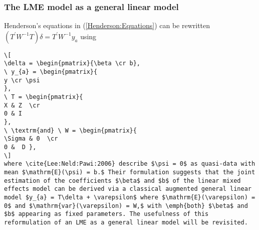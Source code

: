 \documentclass[MAIN.tex]{subfiles}
\begin{document}
\subsubsection{The LME model as a general linear model}
Henderson's equations in (\ref{Henderson:Equations}) can be rewritten $( T^\prime W^{-1} T ) \delta = T^\prime W^{-1} y_{a} $ using
\begin{verbatim}
\[
\delta = \begin{pmatrix}{\beta \cr b},
\ y_{a} = \begin{pmatrix}{
y \cr \psi
},
\ T = \begin{pmatrix}{
X & Z  \cr
0 & I
},
\ \textrm{and} \ W = \begin{pmatrix}{
\Sigma & 0  \cr
0 &  D },
\]
where \cite{Lee:Neld:Pawi:2006} describe $\psi = 0$ as quasi-data with mean $\mathrm{E}(\psi) = b.$ Their formulation suggests that the joint estimation of the coefficients $\beta$ and $b$ of the linear mixed effects model can be derived via a classical augmented general linear model $y_{a} = T\delta + \varepsilon$ where $\mathrm{E}(\varepsilon) = 0$ and $\mathrm{var}(\varepsilon) = W,$ with \emph{both} $\beta$ and $b$ appearing as fixed parameters. The usefulness of this reformulation of an LME as a general linear model will be revisited.

\end{verbatim}
















\end{document}
